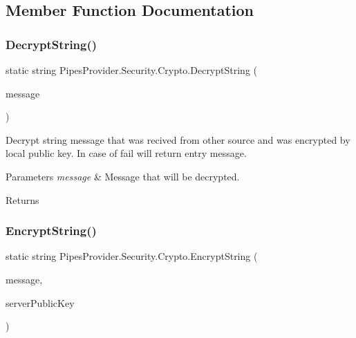 \subsection{Member Function Documentation}
\mbox{\label{class_pipes_provider_1_1_security_1_1_crypto_a2a233d9860e9aee6b2bc49411a4e4917}} 
\subsubsection{\texorpdfstring{Decrypt\+String()}{DecryptString()}}
{\footnotesize\ttfamily static string Pipes\+Provider.\+Security.\+Crypto.\+Decrypt\+String (\begin{DoxyParamCaption}\item[{string}]{message }\end{DoxyParamCaption})\hspace{0.3cm}{\ttfamily [static]}}



Decrypt string message that was recived from other source and was encrypted by local public key. In case of fail will return entry message. 


\begin{DoxyParams}{Parameters}
{\em message} & Message that will be decrypted.\\
\hline
\end{DoxyParams}
\begin{DoxyReturn}{Returns}

\end{DoxyReturn}
\mbox{\label{class_pipes_provider_1_1_security_1_1_crypto_ab43ab066a89134e4207ab0107f17a187}} 
\subsubsection{\texorpdfstring{Encrypt\+String()}{EncryptString()}}
{\footnotesize\ttfamily static string Pipes\+Provider.\+Security.\+Crypto.\+Encrypt\+String (\begin{DoxyParamCaption}\item[{string}]{message,  }\item[{R\+S\+A\+Parameters}]{server\+Public\+Key }\end{DoxyParamCaption})\hspace{0.3cm}{\ttfamily [static]}}



